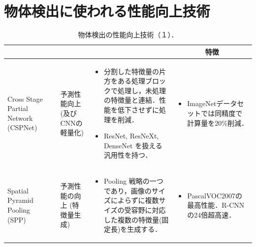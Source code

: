 \documentclass[originalpaper,fleqn]{jsaiart}     %
\begin{document}
\section{物体検出に使われる性能向上技術}
\begin{table}
    \caption{物体検出の性能向上技術（１）．}
    \label{tbl-option1}
    \begin{center}
        \setlength{\tabcolsep}{3pt}
        \footnotesize
        \begin{tabularx}{\linewidth}{Xp{1.5cm}Xp{7cm}X} \toprule
            \centering{技術名称} & \centering{文献} & \centering{用途} & \centering{概要} & \multicolumn{1}{c}{特徴} \\ \midrule

            Cross Stage Partial Network (CSPNet) 
            & \cite{WLWCHY20} & 予測性能向上 (及びCNNの軽量化) & 
            \begin{itemize}
                \vspace{-0.7\baselineskip}
                \setlength{\leftskip}{-3mm}
                \item 分割した特徴量の片方をある処理ブロックで処理し，未処理の特徴量と連結．性能を低下させずに処理を削減．
                \item ResNet, ResNeXt, DenseNet を扱える汎用性を持つ．
            \end{itemize}
            &
            \begin{itemize}
                \vspace{-0.7\baselineskip}
                \setlength{\leftskip}{-3mm}
                \item ImageNetデータセットでは同精度で計算量を20\%削減．
            \end{itemize}
            \\

            Spatial Pyramid Pooling (SPP)
            & \cite{HZRS15,HZRS14} & 予測性能の向上 (特徴量生成) & 
            \begin{itemize}
                \vspace{-0.7\baselineskip}
                \setlength{\leftskip}{-3mm}
                \item Pooling 戦略の一つであり，画像のサイズによらずに複数サイズの受容野に対応した複数の特徴量(固定長)を生成する．
            \end{itemize}
            &
            \begin{itemize}
                \vspace{-0.7\baselineskip}
                \setlength{\leftskip}{-3mm}
                \item PascalVOC2007の最高性能．R-CNNの24倍超高速．
            \end{itemize}
            \\


\end{tabularx}
\end{center}
\end{table}
\end{document}
